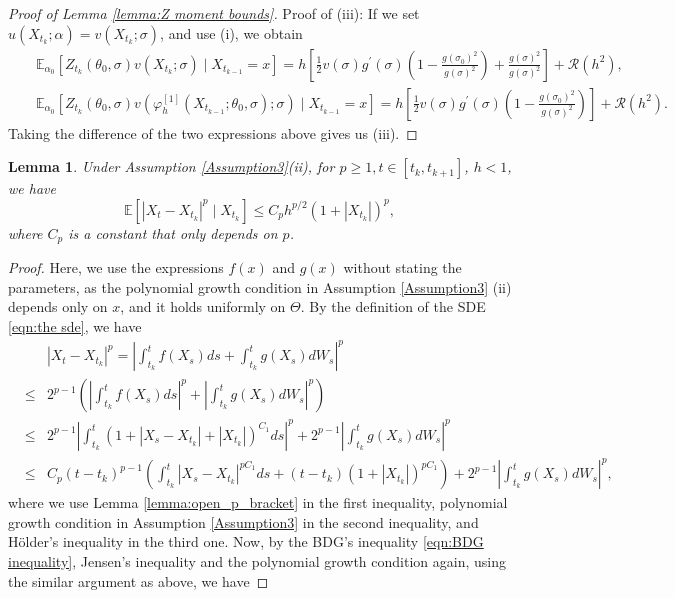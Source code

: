 \documentclass[a4paper,12pt]{article}
\numberwithin{equation}{section}
\theoremstyle{plain}
\newtheorem{lemma}[theorem]{Lemma}
\theoremstyle{definition}
\begin{document}
\begin{appendix}
\begin{proof}[Proof of Lemma \ref{lemma:Z moment bounds}]
    Proof of (iii): If we set $u(X_{t_k};\alpha)=v(X_{t_k};\sigma)$, and use (i), we obtain
    \begin{eqnarray*}
        &&\mathbb{E}_{\alpha_0}\left[Z_{t_k}(\theta_0,\sigma)v(X_{t_k};\sigma)\mid X_{t_{k-1}}=x\right]=h\left[\frac{1}{2}v(\sigma)g^\prime(\sigma)\left(1-\frac{g(\sigma_0)^2}{g(\sigma)^2}\right)+\frac{g(\sigma)^2}{g(\sigma)^2}\right]+\mathcal{R}(h^2),\\
&&\mathbb{E}_{\alpha_0}\left[Z_{t_k}(\theta_0,\sigma)v(\varphi_h^{[1]}(X_{t_{k-1}};\theta_0,\sigma);\sigma)\mid X_{t_{k-1}}=x\right]=h\left[\frac{1}{2}v(\sigma)g^\prime(\sigma)\left(1-\frac{g(\sigma_0)^2}{g(\sigma)^2}\right)\right]+\mathcal{R}(h^2).
    \end{eqnarray*}
    Taking the difference of the  two expressions above gives us (iii).
\end{proof}
\begin{lemma}\label{lemma:X one step bound}
    Under Assumption \ref{Assumption3}(ii), for $p\geq 1, t\in [t_k, t_{k+1}]$,  $h< 1$, we have
    \begin{equation*}
        \mathbb{E}\left[\left|X_{t}-X_{t_k}\right|^p\mid X_{t_k}\right] \leq C_{p} h^{p/2}(1+|X_{t_k}|)^p,
    \end{equation*}
    where $C_p$ is a constant that only depends on $p$.
\end{lemma}
\begin{proof}
    Here, we use the expressions $f(x)$ and $g(x)$ without stating the parameters, as the polynomial growth condition  in Assumption \ref{Assumption3} (ii) depends only on $x$, and it holds uniformly on $\Theta$. By the definition of the SDE \eqref{eqn:the sde}, we have
    \begin{eqnarray*}
       && \left|X_t-X_{t_k}\right|^p=\left|\int_{t_k}^t f(X_s)ds+\int_{t_k}^t g(X_s)dW_s\right|^p\\
       &\leq&2^{p-1}\left(\left|\int_{t_k}^t f(X_s)ds\right|^p+\left|\int_{t_k}^t g(X_s)dW_s\right|^p\right)\\
        &\leq&2^{p-1}\left|\int_{t_k}^t(1+|X_s-X_{t_k}|+|X_{t_k}|)^{C_1}ds\right|^p+2^{p-1}\left|\int_{t_k}^t g(X_s)dW_s\right|^p\\
        &\leq&C_p(t-t_k)^{p-1}\left(\int_{t_k}^t|X_s-X_{t_k}|^{pC_1}ds+(t-t_k)(1+|X_{t_k}|)^{pC_1}\right)+2^{p-1}\left|\int_{t_k}^t g(X_s)dW_s\right|^p,
    \end{eqnarray*}
    where we use Lemma \ref{lemma:open_p_bracket} in the first inequality, polynomial growth condition in Assumption \ref{Assumption3} in the second inequality, and Hölder's inequality in the third one. Now, by the BDG's inequality \eqref{eqn:BDG inequality}, Jensen's inequality and the polynomial growth condition again, using the similar argument as above, we have

\end{proof}
\end{appendix}
\end{document}
